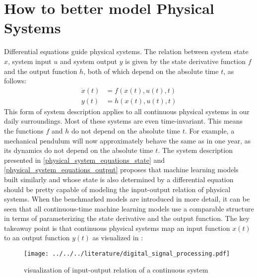 \documentclass[draft,final]{vutinfth} %
\begin{document}
    \section{How to better model Physical Systems} \label{physical_systems}
    Differential equations guide physical systems. The relation between system state $x$, system input $u$ and system output $y$ is given by the state derivative function $f$ and the output function $h$, both of which depend on the absolute time $t$, as follows:
    \begin{align} 
        \label{physical_system_equations_state}
        \dot x(t) &= f(x(t),u(t),t) \\
        \label{physical_system_equations_output}
        y(t) &= h(x(t),u(t),t)
    \end{align}
    This form of system description applies to all continuous physical systems in our daily surroundings. Most of these systems are even time-invariant. 
    This means the functions $f$ and $h$ do not depend on the absolute time $t$.
    For example, a mechanical pendulum will now approximately behave the same as in one year, as its dynamics do not depend on the absolute time $t$.
    The system description presented in \ref{physical_system_equations_state} and \ref{physical_system_equations_output} proposes that machine learning models built similarly and whose state is also determined by a differential equation should be pretty capable of modeling the input-output relation of physical systems.
    When the benchmarked models are introduced in more detail, it can be seen that all continuous-time machine learning models use a comparable structure in terms of parameterizing the state derivative and the output function.
    The key takeaway point is that continuous physical systems map an input function $x(t)$ to an output function $y(t)$ as visualized in \cite[p. 102]{dsp}:
    \begin{figure}[H]
        \centering{}
        \texttt{[image: ../../../literature/digital\_signal\_processing.pdf]}
        \caption{visualization of input-output relation of a continuous system}
        \label{fig:continuous_system_vis}
    \end{figure}
    
\end{document}
